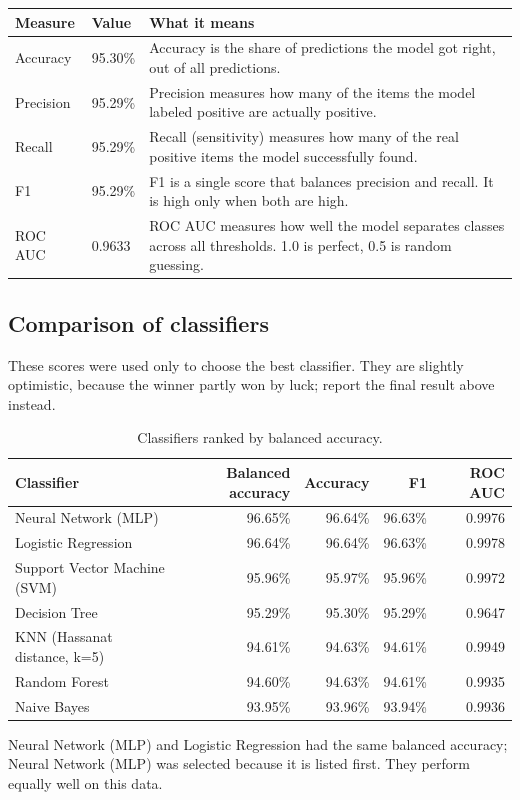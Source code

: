 \documentclass[11pt,a4paper]{article}
\begin{document}
\begin{table}[H]
\centering
\begin{tabular}{llp{}}
\toprule
Measure & Value & What it means\\
\midrule
Accuracy & 95.30\% & \parbox[t]{0.55\textwidth}{\small Accuracy is the share of predictions the model got right, out of all predictions.}\\[3pt]
Precision & 95.29\% & \parbox[t]{0.55\textwidth}{\small Precision measures how many of the items the model labeled positive are actually positive.}\\[3pt]
Recall & 95.29\% & \parbox[t]{0.55\textwidth}{\small Recall (sensitivity) measures how many of the real positive items the model successfully found.}\\[3pt]
F1 & 95.29\% & \parbox[t]{0.55\textwidth}{\small F1 is a single score that balances precision and recall. It is high only when both are high.}\\[3pt]
ROC AUC & 0.9633 & \parbox[t]{0.55\textwidth}{\small ROC AUC measures how well the model separates classes across all thresholds. 1.0 is perfect, 0.5 is random guessing.}\\[3pt]
\bottomrule
\end{tabular}
\end{table}
\subsection*{Comparison of classifiers}
These scores were used only to choose the best classifier. They are slightly optimistic, because the winner partly won by luck; report the final result above instead.

\begin{table}[H]
\centering
\small
\begin{tabular}{lrrrr}
\toprule
Classifier & Balanced accuracy & Accuracy & F1 & ROC AUC\\
\midrule
Neural Network (MLP) & 96.65\% & 96.64\% & 96.63\% & 0.9976\\
Logistic Regression & 96.64\% & 96.64\% & 96.63\% & 0.9978\\
Support Vector Machine (SVM) & 95.96\% & 95.97\% & 95.96\% & 0.9972\\
Decision Tree & 95.29\% & 95.30\% & 95.29\% & 0.9647\\
KNN (Hassanat distance, k=5) & 94.61\% & 94.63\% & 94.61\% & 0.9949\\
Random Forest & 94.60\% & 94.63\% & 94.61\% & 0.9935\\
Naive Bayes & 93.95\% & 93.96\% & 93.94\% & 0.9936\\
\bottomrule
\end{tabular}
\caption{Classifiers ranked by balanced accuracy.}
\end{table}
Neural Network (MLP) and Logistic Regression had the same balanced accuracy; Neural Network (MLP) was selected because it is listed first. They perform equally well on this data.
\end{document}
